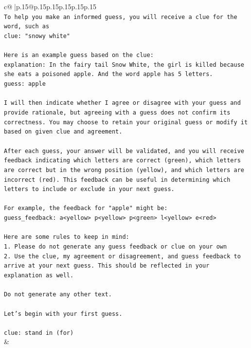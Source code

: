 \documentclass{article}
\begin{document}
{\begin{supertabular}{c@{$\;$}|p{.15\linewidth}@{}p{.15\linewidth}p{.15\linewidth}p{.15\linewidth}p{.15\linewidth}p{.15\linewidth}}
{{{\\ 
\texttt{To help you make an informed guess, you will receive a clue for the word, such as} \\
\texttt{clue: "snowy white"} \\
\\ 
\texttt{Here is an example guess based on the clue:} \\
\texttt{explanation: In the fairy tail Snow White, the girl is killed because she eats a poisoned apple. And the word apple has 5 letters.} \\
\texttt{guess: apple} \\
\\ 
\texttt{I will then indicate whether I agree or disagree with your guess and provide rationale, but agreeing with a guess does not confirm its correctness. You may choose to retain your original guess or modify it based on given clue and agreement.} \\
\\ 
\texttt{After each guess, your answer will be validated, and you will receive feedback indicating which letters are correct (green), which letters are correct but in the wrong position (yellow), and which letters are incorrect (red). This feedback can be useful in determining which letters to include or exclude in your next guess.} \\
\\ 
\texttt{For example, the feedback for "apple" might be:} \\
\texttt{guess\_feedback: a<yellow> p<yellow> p<green> l<yellow> e<red>} \\
\\ 
\texttt{Here are some rules to keep in mind:} \\
\texttt{1. Please do not generate any guess feedback or clue on your own} \\
\texttt{2. Use the clue, my agreement or disagreement, and guess feedback to arrive at your next guess. This should be reflected in your explanation as well.} \\
\\ 
\texttt{Do not generate any other text.} \\
\\ 
\texttt{Let's begin with your first guess.} \\
\\ 
\texttt{clue: stand in (for)} \\
            }
        }
    }
    & \\ \\


\end{supertabular}}
\end{document}
